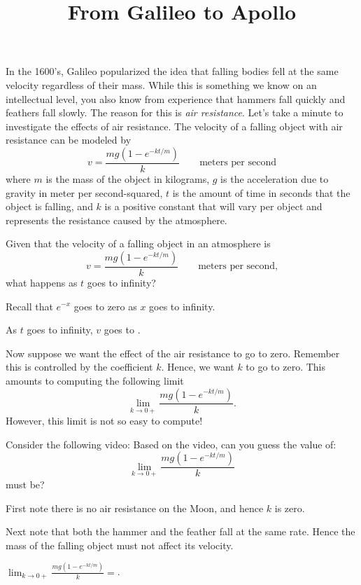 \documentclass{ximera}
\title[Break-Ground:]{From Galileo to Apollo}
\begin{document}
\begin{abstract}

\end{abstract}
\maketitle


In the 1600's, Galileo popularized the idea that falling bodies fell
at the same velocity regardless of their mass. While this is something
we know on an intellectual level, you also know from experience that
hammers fall quickly and feathers fall slowly. The reason for this is
\textit{air resistance}.  Let's take a minute to investigate the
effects of air resistance. The velocity of a falling object with air
resistance can be modeled by
\[
v = \frac{mg(1-e^{-kt/m})}{k}\qquad\text{meters per second}
\]
where $m$ is the mass of the object in kilograms, $g$ is the
acceleration due to gravity in meter per second-squared, $t$ is the
amount of time in seconds that the object is falling, and $k$ is a
positive constant that will vary per object and represents the
resistance caused by the atmosphere.

\begin{problem}
Given that the velocity of a falling object in an atmosphere is 
\[
v = \frac{mg(1-e^{-kt/m})}{k}\qquad\text{meters per second,}
\]
what happens as $t$ goes to infinity?
\begin{hint}
Recall that $e^{-x}$ goes to zero as $x$ goes to infinity.
\end{hint}
\begin{prompt}
As $t$ goes to infinity, $v$ goes to .
\end{prompt}
\end{problem}


Now suppose we want the effect of the air resistance to go to
zero. Remember this is controlled by the coefficient $k$. Hence, we
want $k$ to go to zero. This amounts to computing the following limit
\[
\lim_{k\to 0+} \frac{mg(1-e^{-kt/m})}{k}.
\]
However, this limit is not so easy to compute!

\begin{problem}
Consider the following video: 
Based on the video, can you guess the value of:
\[
\lim_{k\to 0+} \frac{mg(1-e^{-kt/m})}{k}
\]
must be?
\begin{hint}
First note there is no air resistance on the Moon, and hence $k$ is
zero.
\end{hint}
\begin{hint}
Next note that both the hammer and the feather fall at the same rate.
Hence the mass of the falling object must not affect its velocity.
\end{hint}
\begin{prompt}
$\lim_{k\to 0+}\frac{mg(1-e^{-kt/m})}{k} = $.
\end{prompt}
\end{problem}
\end{document}
